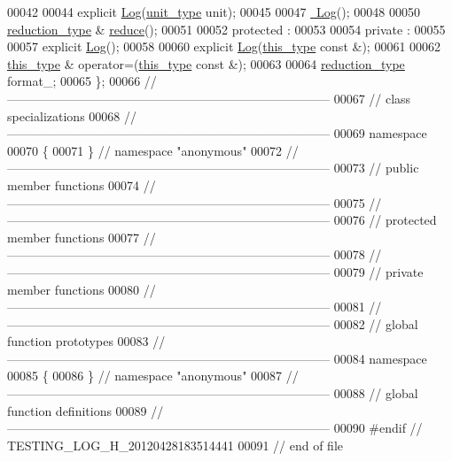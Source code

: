 \begin{DoxyCode}
00042 
00044     \textcolor{keyword}{explicit} \hyperlink{classhryky_1_1testing_1_1_log}{Log}(\hyperlink{classhryky_1_1testing_1_1unit_1_1_base}{unit_type} unit);
00045     
00047     \hyperlink{classhryky_1_1testing_1_1_log_a3c34d26e3b2e3a3c5dbca732f2f816bb}{~Log}();
00048 
00050     \hyperlink{classhryky_1_1reduction_1_1_map}{reduction_type} & \hyperlink{classhryky_1_1testing_1_1_log_a771620257c6bc6fc1c3f1e997053f275}{reduce}();
00051 
00052 \textcolor{keyword}{protected} :
00053 
00054 \textcolor{keyword}{private} :
00055 
00057     \textcolor{keyword}{explicit} \hyperlink{classhryky_1_1testing_1_1_log}{Log}();
00058 
00060     \textcolor{keyword}{explicit} \hyperlink{classhryky_1_1testing_1_1_log}{Log}(\hyperlink{classhryky_1_1testing_1_1_log}{this_type} \textcolor{keyword}{const} &);
00061 
00062     \hyperlink{classhryky_1_1testing_1_1_log}{this_type} & operator=(\hyperlink{classhryky_1_1testing_1_1_log}{this_type} \textcolor{keyword}{const} &);
00063 
00064     \hyperlink{classhryky_1_1reduction_1_1_map}{reduction_type}             format\_;
00065 \};
00066 \textcolor{comment}{//
      ------------------------------------------------------------------------------}
00067 \textcolor{comment}{// class specializations}
00068 \textcolor{comment}{//
      ------------------------------------------------------------------------------}
00069 \textcolor{keyword}{namespace}
00070 \{
00071 \} \textcolor{comment}{// namespace "anonymous"}
00072 \textcolor{comment}{//
      ------------------------------------------------------------------------------}
00073 \textcolor{comment}{// public member functions}
00074 \textcolor{comment}{//
      ------------------------------------------------------------------------------}
00075 \textcolor{comment}{//
      ------------------------------------------------------------------------------}
00076 \textcolor{comment}{// protected member functions}
00077 \textcolor{comment}{//
      ------------------------------------------------------------------------------}
00078 \textcolor{comment}{//
      ------------------------------------------------------------------------------}
00079 \textcolor{comment}{// private member functions}
00080 \textcolor{comment}{//
      ------------------------------------------------------------------------------}
00081 \textcolor{comment}{//
      ------------------------------------------------------------------------------}
00082 \textcolor{comment}{// global function prototypes}
00083 \textcolor{comment}{//
      ------------------------------------------------------------------------------}
00084 \textcolor{keyword}{namespace}
00085 \{
00086 \} \textcolor{comment}{// namespace "anonymous"}
00087 \textcolor{comment}{//
      ------------------------------------------------------------------------------}
00088 \textcolor{comment}{// global function definitions}
00089 \textcolor{comment}{//
      ------------------------------------------------------------------------------}
00090 \textcolor{preprocessor}{#endif // TESTING\_LOG\_H\_20120428183514441}
00091 \textcolor{preprocessor}{}\textcolor{comment}{// end of file}
\end{DoxyCode}
